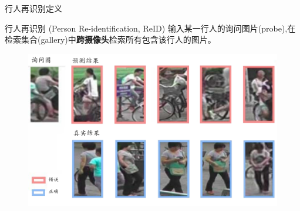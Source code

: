 \documentclass[usenames,dvipsnames,notes]{beamer}
\begin{document}
\begin{frame}
	{行人再识别定义}
	\begin{block}{行人再识别 (Person Re-identification, ReID)}
		输入某一行人的询问图片(probe),在检索集合(gallery)中{\bf 跨摄像头}检索所有包含该行人的图片。
	\end{block}
	\begin{figure}
		\includegraphics[width=0.9\linewidth]{2018-03-11-22-56-05.pdf}
	\end{figure}
\end{frame}
\end{document}
